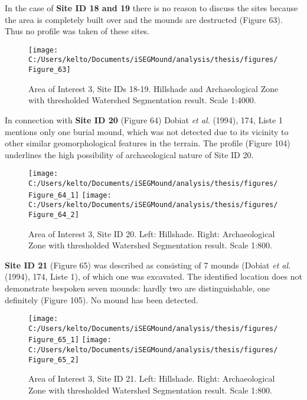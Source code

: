 \documentclass[
  12pt,
]{article}
\begin{document}
In the case of \textbf{Site ID 18 and 19} there is no reason to discuss the sites because the area is completely built over and the mounds are destructed (Figure 63). Thus no profile was taken of these sites.

\begin{figure}

{\centering \texttt{[image: C:/Users/kelto/Documents/iSEGMound/analysis/thesis/figures/Figure\_63]} 

}

\caption{Area of Interest 3, Site IDs 18-19. Hillshade and Archaeological Zone with thresholded Watershed Segmentation result. Scale 1:4000.}\label{fig:Figure63}
\end{figure}

In connection with \textbf{Site ID 20} (Figure 64) Dobiat \emph{et al.} (1994), 174, Liste 1 mentions only one burial mound, which was not detected due to its vicinity to other similar geomorphological features in the terrain. The profile (Figure 104) underlines the high possibility of archaeological nature of Site ID 20.

\begin{figure}
\texttt{[image: C:/Users/kelto/Documents/iSEGMound/analysis/thesis/figures/Figure\_64\_1]} \texttt{[image: C:/Users/kelto/Documents/iSEGMound/analysis/thesis/figures/Figure\_64\_2]} \caption{Area of Interest 3, Site ID 20. Left: Hillshade. Right: Archaeological Zone with thresholded Watershed Segmentation result. Scale 1:800.}\label{fig:Figure64}
\end{figure}

\textbf{Site ID 21} (Figure 65) was described as consisting of 7 mounds (Dobiat \emph{et al.} (1994), 174, Liste 1), of which one was excavated. The identified location does not demonstrate bespoken seven mounds: hardly two are distinguishable, one definitely (Figure 105). No mound has been detected.

\begin{figure}
\texttt{[image: C:/Users/kelto/Documents/iSEGMound/analysis/thesis/figures/Figure\_65\_1]} \texttt{[image: C:/Users/kelto/Documents/iSEGMound/analysis/thesis/figures/Figure\_65\_2]} \caption{Area of Interest 3, Site ID 21. Left: Hillshade. Right: Archaeological Zone with thresholded Watershed Segmentation result. Scale 1:800.}\label{fig:Figure65}
\end{figure}
\end{document}
